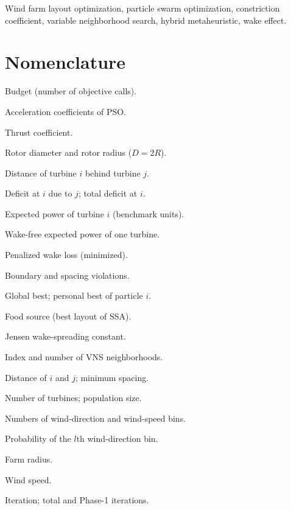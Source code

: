 \documentclass[journal,twoside]{IEEEtran}
\begin{document}
\begin{IEEEkeywords}
Wind farm layout optimization, particle swarm optimization, constriction coefficient, variable neighborhood search, hybrid metaheuristic, wake effect.
\end{IEEEkeywords}

\section*{Nomenclature}
\begin{IEEEdescription}
\item[$B$] Budget (number of objective calls).
\item[$c_1$, $c_2$] Acceleration coefficients of PSO.
\item[$C_T$] Thrust coefficient.
\item[$D$, $R$] Rotor diameter and rotor radius ($D=2R$).
\item[$d_{ij}$] Distance of turbine $i$ behind turbine $j$.
\item[$\Delta_{ij}$, $\Delta_i$] Deficit at $i$ due to $j$; total deficit at $i$.
\item[$E(P_i)$] Expected power of turbine $i$ (benchmark units).
\item[$E_{\rm ideal}$] Wake-free expected power of one turbine.
\item[$F_p$] Penalized wake loss (minimized).
\item[$g^{\rm b}_i$, $g^{\rm s}_{ij}$] Boundary and spacing violations.
\item[$\mathbf G$, $\mathbf P^i$] Global best; personal best of particle $i$.
\item[$\mathbf H$] Food source (best layout of SSA).
\item[$K$] Jensen wake-spreading constant.
\item[$k$, $k_{\max}$] Index and number of VNS neighborhoods.
\item[$\ell_{ij}$, $\ell_{\min}$] Distance of $i$ and $j$; minimum spacing.
\item[$N$, $N_p$] Number of turbines; population size.
\item[$N_\theta$, $N_s$] Numbers of wind-direction and wind-speed bins.
\item[$p_l$] Probability of the $l$th wind-direction bin.
\item[$r$] Farm radius.
\item[$s$] Wind speed.
\item[$t$, $T$, $T_1$] Iteration; total and Phase-1 iterations.

\end{IEEEdescription}
\end{document}
